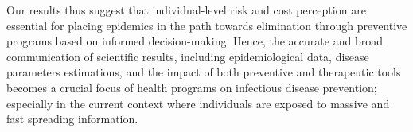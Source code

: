 Our results thus suggest that individual-level risk and cost perception are essential for placing epidemics in the path towards elimination through preventive programs based on informed decision-making. Hence, the accurate and broad communication of scientific results, including epidemiological data, disease parameters estimations, and the impact of both preventive and therapeutic tools becomes a crucial focus of health programs on infectious disease prevention; especially in the current context where individuals are exposed to massive and fast spreading information. 